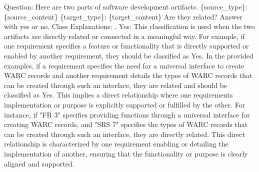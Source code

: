 Question: Here are two parts of software development artifacts.\newline
\newline
\{source\_type\}: \textquotesingle{}\textquotesingle{}\textquotesingle{}\{source\_content\}\textquotesingle{}\textquotesingle{}\textquotesingle{}\newline
\newline
\{target\_type\}: \textquotesingle{}\textquotesingle{}\textquotesingle{}\{target\_content\}\textquotesingle{}\textquotesingle{}\textquotesingle{}\newline
Are they related?\newline
\newline
Answer with \textquotesingle{}yes\textquotesingle{} or \textquotesingle{}no\textquotesingle{}.\newline
\newline
Class Explanations:\newline
{}. \*\*Yes\*\*: This classification is used when the two artifacts are directly related or connected in a meaningful way. For example, if one requirement specifies a feature or functionality that is directly supported or enabled by another requirement, they should be classified as \textquotesingle{}Yes\textquotesingle{}. In the provided examples, if a requirement specifies the need for a universal interface to create WARC records and another requirement details the types of WARC records that can be created through such an interface, they are related and should be classified as \textquotesingle{}Yes\textquotesingle{}. This implies a direct relationship where one requirement\textquotesingle{}s implementation or purpose is explicitly supported or fulfilled by the other. For instance, if "FR 3" specifies providing functions through a universal interface for creating WARC records, and "SRS 7" specifies the types of WARC records that can be created through such an interface, they are directly related. This direct relationship is characterized by one requirement enabling or detailing the implementation of another, ensuring that the functionality or purpose is clearly aligned and supported.\newline
\newline
